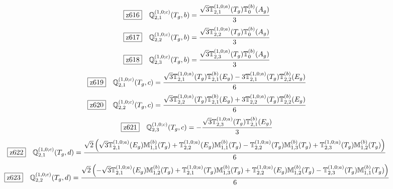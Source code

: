 \documentclass[fleqn,10pt,landscape]{jsarticle}
\begin{document}
\begin{dmath*}
\hspace*{3mm}\fbox{z616}\quad \mathbb{Q}_{2,1}^{(1,0;c)}(T_{g},b)=\frac{\sqrt{3} \mathbb{T}_{2,1}^{(1,0;a)}(T_{g}) \mathbb{T}_{0}^{(b)}(A_{g})}{3}
\end{dmath*}
\begin{dmath*}
\hspace*{3mm}\fbox{z617}\quad \mathbb{Q}_{2,2}^{(1,0;c)}(T_{g},b)=\frac{\sqrt{3} \mathbb{T}_{2,2}^{(1,0;a)}(T_{g}) \mathbb{T}_{0}^{(b)}(A_{g})}{3}
\end{dmath*}
\begin{dmath*}
\hspace*{3mm}\fbox{z618}\quad \mathbb{Q}_{2,3}^{(1,0;c)}(T_{g},b)=\frac{\sqrt{3} \mathbb{T}_{2,3}^{(1,0;a)}(T_{g}) \mathbb{T}_{0}^{(b)}(A_{g})}{3}
\end{dmath*}
\begin{dmath*}
\hspace*{3mm}\fbox{z619}\quad \mathbb{Q}_{2,1}^{(1,0;c)}(T_{g},c)=\frac{\sqrt{3} \mathbb{T}_{2,1}^{(1,0;a)}(T_{g}) \mathbb{T}_{2,1}^{(b)}(E_{g}) - 3 \mathbb{T}_{2,1}^{(1,0;a)}(T_{g}) \mathbb{T}_{2,2}^{(b)}(E_{g})}{6}
\end{dmath*}
\begin{dmath*}
\hspace*{3mm}\fbox{z620}\quad \mathbb{Q}_{2,2}^{(1,0;c)}(T_{g},c)=\frac{\sqrt{3} \mathbb{T}_{2,2}^{(1,0;a)}(T_{g}) \mathbb{T}_{2,1}^{(b)}(E_{g}) + 3 \mathbb{T}_{2,2}^{(1,0;a)}(T_{g}) \mathbb{T}_{2,2}^{(b)}(E_{g})}{6}
\end{dmath*}
\begin{dmath*}
\hspace*{3mm}\fbox{z621}\quad \mathbb{Q}_{2,3}^{(1,0;c)}(T_{g},c)=- \frac{\sqrt{3} \mathbb{T}_{2,3}^{(1,0;a)}(T_{g}) \mathbb{T}_{2,1}^{(b)}(E_{g})}{3}
\end{dmath*}
\begin{dmath*}
\hspace*{3mm}\fbox{z622}\quad \mathbb{Q}_{2,1}^{(1,0;c)}(T_{g},d)=\frac{\sqrt{2} \left(\sqrt{3} \mathbb{T}_{2,1}^{(1,0;a)}(E_{g}) \mathbb{M}_{1,1}^{(b)}(T_{g}) + \mathbb{T}_{2,2}^{(1,0;a)}(E_{g}) \mathbb{M}_{1,1}^{(b)}(T_{g}) - \mathbb{T}_{2,2}^{(1,0;a)}(T_{g}) \mathbb{M}_{1,3}^{(b)}(T_{g}) + \mathbb{T}_{2,3}^{(1,0;a)}(T_{g}) \mathbb{M}_{1,2}^{(b)}(T_{g})\right)}{6}
\end{dmath*}
\begin{dmath*}
\hspace*{3mm}\fbox{z623}\quad \mathbb{Q}_{2,2}^{(1,0;c)}(T_{g},d)=\frac{\sqrt{2} \left(- \sqrt{3} \mathbb{T}_{2,1}^{(1,0;a)}(E_{g}) \mathbb{M}_{1,2}^{(b)}(T_{g}) + \mathbb{T}_{2,1}^{(1,0;a)}(T_{g}) \mathbb{M}_{1,3}^{(b)}(T_{g}) + \mathbb{T}_{2,2}^{(1,0;a)}(E_{g}) \mathbb{M}_{1,2}^{(b)}(T_{g}) - \mathbb{T}_{2,3}^{(1,0;a)}(T_{g}) \mathbb{M}_{1,1}^{(b)}(T_{g})\right)}{6}
\end{dmath*}
\end{document}
